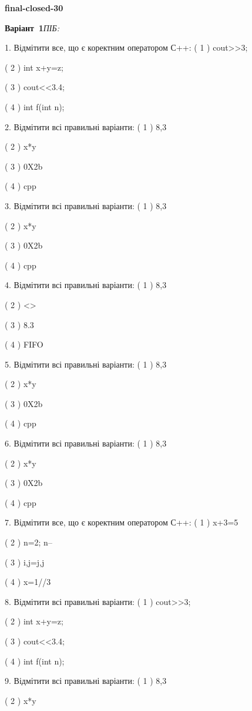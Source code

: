 \documentclass[11pt]{article}
\begin{document}
{\large\textbf{final-closed-30}}

\textbf{Варіант \No\,1}\hfill \textit{ПІБ:}\,\underline{\hspace{60mm}}
\vspace{4mm}

1. Відмітити все, що є коректним оператором С++:
( 1 ) cout>>3;

( 2 ) int x+y=z;

( 3 ) cout<<3.4;

( 4 ) int f(int n);

2. Відмітити всі правильні варіанти:
( 1 ) 8,3

( 2 ) x*y

( 3 ) 0X2b

( 4 ) cpp

3. Відмітити всі правильні варіанти:
( 1 ) 8,3

( 2 ) x*y

( 3 ) 0X2b

( 4 ) cpp

4. Відмітити всі правильні варіанти:
( 1 ) 8,3

( 2 ) <>

( 3 ) 8.3

( 4 ) FIFO

5. Відмітити всі правильні варіанти:
( 1 ) 8,3

( 2 ) x*y

( 3 ) 0X2b

( 4 ) cpp

6. Відмітити всі правильні варіанти:
( 1 ) 8,3

( 2 ) x*y

( 3 ) 0X2b

( 4 ) cpp

7. Відмітити все, що є коректним оператором С++:
( 1 ) x+3=5

( 2 ) n=2; n--

( 3 ) i,j=j,j

( 4 ) x=1//3

8. Відмітити всі правильні варіанти:
( 1 ) cout>>3;

( 2 ) int x+y=z;

( 3 ) cout<<3.4;

( 4 ) int f(int n);

9. Відмітити всі правильні варіанти:
( 1 ) 8,3

( 2 ) x*y
\end{document}
